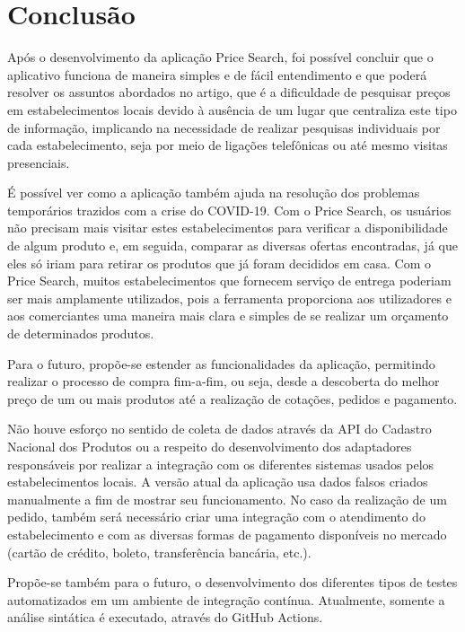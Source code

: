 \section{Conclusão}
\label{sec:conclusao}

Após o desenvolvimento da aplicação Price Search, foi possível concluir que o aplicativo funciona de maneira simples e de fácil entendimento e que poderá resolver os assuntos abordados no artigo, que é a dificuldade de pesquisar preços em estabelecimentos locais devido à ausência de um lugar que centraliza este tipo de informação, implicando na necessidade de realizar pesquisas individuais por cada estabelecimento, seja por meio de ligações telefônicas ou até mesmo visitas presenciais.

É possível ver como a aplicação também ajuda na resolução dos problemas temporários trazidos com a crise do COVID-19. Com o Price Search, os usuários não precisam mais visitar estes estabelecimentos para verificar a disponibilidade de algum produto e, em seguida, comparar as diversas ofertas encontradas, já que eles só iriam para retirar os produtos que já foram decididos em casa. Com o Price Search, muitos estabelecimentos que fornecem serviço de entrega poderiam ser mais amplamente utilizados, pois a ferramenta proporciona aos utilizadores e aos comerciantes uma maneira mais clara e simples de se realizar um orçamento de determinados produtos.

Para o futuro, propõe-se estender as funcionalidades da aplicação, permitindo realizar o processo de compra fim-a-fim, ou seja, desde a descoberta do melhor preço de um ou mais produtos até a realização de cotações, pedidos e pagamento.

Não houve esforço no sentido de coleta de dados através da API do Cadastro Nacional dos Produtos ou a respeito do desenvolvimento dos adaptadores responsáveis por realizar a integração com os diferentes sistemas usados pelos estabelecimentos locais. A versão atual da aplicação usa dados falsos criados manualmente a fim de mostrar seu funcionamento. No caso da realização de um pedido, também será necessário criar uma integração com o atendimento do estabelecimento e com as diversas formas de pagamento disponíveis no mercado (cartão de crédito, boleto, transferência bancária, etc.).

Propõe-se também para o futuro, o desenvolvimento dos diferentes tipos de testes automatizados em um ambiente de integração contínua. Atualmente, somente a análise sintática é executado, através do GitHub Actions.

